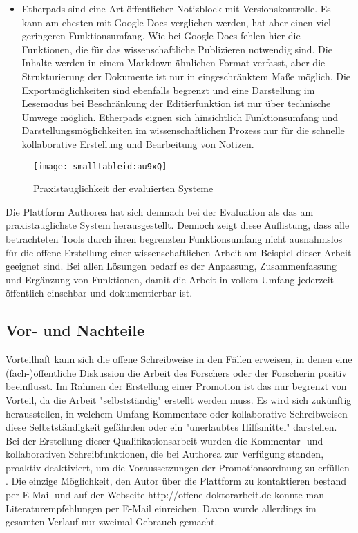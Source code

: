 \begin{itemize}
\item Etherpads sind eine Art öffentlicher Notizblock mit Versionskontrolle. Es kann am ehesten mit Google Docs verglichen werden, hat aber einen viel geringeren Funktionsumfang. Wie bei Google Docs fehlen hier die Funktionen, die für das wissenschaftliche Publizieren notwendig sind. Die Inhalte werden in einem Markdown-ähnlichen Format verfasst, aber die Strukturierung der Dokumente ist nur in eingeschränktem Maße möglich. Die Exportmöglichkeiten sind ebenfalls begrenzt und eine Darstellung im Lesemodus bei Beschränkung der Editierfunktion ist nur über technische Umwege möglich. Etherpads eignen sich hinsichtlich Funktionsumfang und Darstellungsmöglichkeiten im wissenschaftlichen Prozess nur für die schnelle kollaborative Erstellung und Bearbeitung von Notizen.
\end{itemize}

\begin{figure}[h!]
\texttt{[image: smalltableid:au9xQ]}
\caption{Praxistauglichkeit der evaluierten Systeme}
\end{figure}

Die Plattform Authorea hat sich demnach bei der Evaluation als das am praxistauglichste System herausgestellt. Dennoch zeigt diese Auflistung, dass alle betrachteten Tools durch ihren begrenzten Funktionsumfang nicht ausnahmslos für die offene Erstellung einer wissenschaftlichen Arbeit am Beispiel dieser Arbeit geeignet sind. Bei allen Lösungen bedarf es der Anpassung, Zusammenfassung und Ergänzung von Funktionen, damit die Arbeit in vollem Umfang jederzeit öffentlich einsehbar und dokumentierbar ist.

\subsection{Vor- und Nachteile}

Vorteilhaft kann sich die offene Schreibweise in den Fällen erweisen, in denen eine (fach-)öffentliche Diskussion die Arbeit des Forschers oder der Forscherin positiv beeinflusst. Im Rahmen der Erstellung einer Promotion ist das nur begrenzt von Vorteil, da die Arbeit "selbstständig" \cite{Leuphana_2011} erstellt werden muss. Es wird sich zukünftig herausstellen, in welchem Umfang Kommentare oder kollaborative Schreibweisen diese Selbstständigkeit gefährden oder ein "unerlaubtes Hilfsmittel" \cite{Leuphana_2011} darstellen. Bei der Erstellung dieser Qualifikationsarbeit wurden die Kommentar- und kollaborativen Schreibfunktionen, die bei Authorea zur Verfügung standen, proaktiv deaktiviert, um die Voraussetzungen der Promotionsordnung zu erfüllen \cite{Heise_2013}. Die einzige Möglichkeit, den Autor über die Plattform zu kontaktieren bestand per E-Mail und auf der Webseite http://offene-doktorarbeit.de konnte man Literaturempfehlungen per E-Mail einreichen. Davon wurde allerdings im gesamten Verlauf nur zweimal Gebrauch gemacht.

